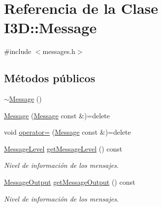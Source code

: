 \hypertarget{class_i3_d_1_1_message}{}\section{Referencia de la Clase I3D\+:\+:Message}
\label{class_i3_d_1_1_message}


{\ttfamily \#include $<$messages.\+h$>$}

\subsection*{Métodos públicos}
\begin{DoxyCompactItemize}
\item 
\hyperlink{class_i3_d_1_1_message_a96370615d50060b3c7326da6374887ef}{$\sim$\+Message} ()
\item 
\hyperlink{class_i3_d_1_1_message_af1da7ef3a7ce40e79c298b1ebc9c2796}{Message} (\hyperlink{class_i3_d_1_1_message}{Message} const \&)=delete
\item 
void \hyperlink{class_i3_d_1_1_message_a7a757579a6966a8a80aeac7529a34b4b}{operator=} (\hyperlink{class_i3_d_1_1_message}{Message} const \&)=delete
\item 
\hyperlink{namespace_i3_d_a994cd716e000a4023e180dcdb9b3a9c0}{Message\+Level} \hyperlink{class_i3_d_1_1_message_aa5360e772b5fd6921bd4e8b3ec6925d8}{get\+Message\+Level} () const 
\begin{DoxyCompactList}\small\item\em Nivel de información de los mensajes. \end{DoxyCompactList}\item 
\hyperlink{namespace_i3_d_accba1eafa248ca79da818a0b72e60964}{Message\+Output} \hyperlink{class_i3_d_1_1_message_a50251ba85bee381914c137a23bd0fbe1}{get\+Message\+Output} () const 
\begin{DoxyCompactList}\small\item\em Nivel de información de los mensajes. \end{DoxyCompactList}\end{DoxyCompactItemize}
